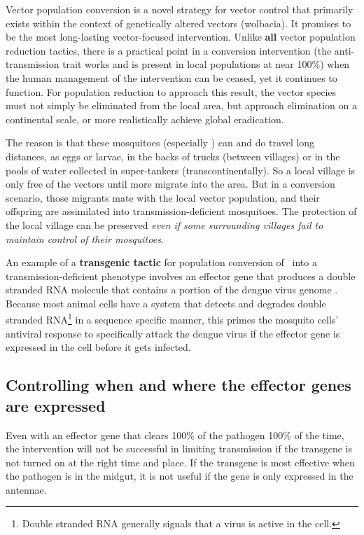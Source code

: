 Vector population conversion is a novel strategy for vector control that primarily exists within the context of genetically altered vectors (\CITEME wolbacia).
It promises to be the most long-lasting vector-focused intervention.
Unlike \textbf{all} vector population reduction tactics, there is a practical point in a conversion intervention (the anti-transmission trait works and is present in local populations at near 100\%) when the human management of the intervention can be ceased, yet it continues to function.
For population reduction to approach this result, the vector species must not simply be eliminated from the local area, but approach elimination on a continental scale, or more realistically achieve global eradication.

The reason is that these mosquitoes (especially \Aa) can and do travel long distances, as eggs or larvae, in the backs of trucks (between villages) or in the pools of water collected in super-tankers (transcontinentally).
So a local village is only free of the vectors until more migrate into the area.
But in a conversion scenario, those migrants mate with the local vector population, and their offspring are assimilated into transmission-deficient mosquitoes.
The protection of the local village can be preserved \emph{even if some surrounding villages fail to maintain control of their mosquitoes}.

An example of a \textbf{transgenic tactic} for population conversion of \Aa\ into a transmission-deficient phenotype involves an effector gene that produces a double stranded RNA molecule that contains a portion of the dengue virus genome \cite{Franz2006,Mathur2010}.
Because most animal cells have a system that detects and degrades double stranded RNA\footnote{Double stranded RNA generally signals that a virus is active in the cell.}
in a sequence specific manner, this primes the mosquito cells' antiviral response to specifically attack the dengue virus if the effector gene is expressed in the cell before it gets infected.

\subsection{Controlling when and where the effector genes are expressed}

Even with an effector gene that clears 100\% of the pathogen 100\% of the time, the intervention will not be successful in limiting transmission if the transgene is not turned on at the right time and place.
If the transgene is most effective when the pathogen is in the midgut, it is not useful if the gene is only expressed in the antennae.

